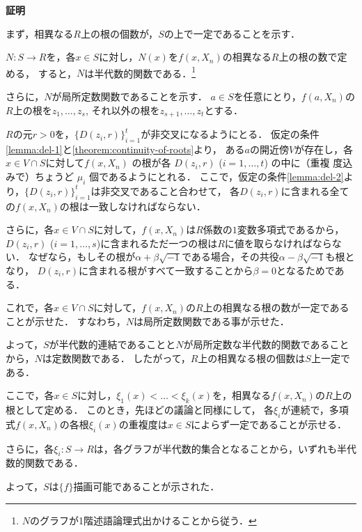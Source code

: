 \documentclass[uplatex, dvipdfmx]{jsarticle}
\makeatletter
\numberwithin{equation}{section}
\renewenvironment{proof}[1][\proofname]{\par
  \pushQED{\qed}%
  \normalfont \topsep6\p@\@plus6\p@\relax
  \trivlist
  \item\relax
  {\bfseries
  #1\@addpunct{.}}\hspace\labelsep\ignorespaces
}{
  \popQED\endtrivlist\@endpefalse
}
\newcommand{\map}[3]{{#1}\colon{#2}\rightarrow{#3}}
\theoremstyle{definition}
\renewcommand{\proofname}{\textbf{証明}}
\makeatother
\begin{document}
\begin{proof}
     まず，相異なる$R$上の根の個数が，$S$の上で一定であることを示す．

     $\map{N}{S}{R}$を，各$x \in S$に対し，$N(x)$を$f(x,X_n)$の相異なる$R$上の根の数で定める，
     すると，$N$は半代数的関数である．\footnote{$N$のグラフが1階述語論理式出かけることから従う．}
     
     さらに，$N$が局所定数関数であることを示す．
     $a \in S$を任意にとり，$f(a,X_n)$の$R$上の根を$z_1, \dots, z_s$, それ以外の根を$z_{s+1}, \dots, z_t$とする．

     $R$の元$r > 0$を，$\{D(z_i,r)\}_{i=1}^t$が非交叉になるようにとる．
     仮定の条件\ref{lemma:del-1}と\cref{theorem:continuity-of-roots}より，
     ある$a$の開近傍$V$が存在し，各$x \in V \cap S$に対して$f (x, X_n)$ の根が各 $D(z_i, r)$ ($i = 1, \dots , t$) の中に（重複
     度込みで）ちょうど $\mu_i$ 個であるようにとれる．
     ここで，仮定の条件\ref{lemma:del-2}より，$\{D(z_i, r)\}_{i=1}^t$は非交叉であること合わせて，
     各$D(z_i, r)$に含まれる全ての$f(x, X_n)$の根は一致しなければならない．

     さらに，各$x \in V \cap S$に対して，$f(x,X_n)$は$R$係数の$1$変数多項式であるから，
     $D(z_i, r)$ ($i=1, \dots, s$)に含まれるただ一つの根は$R$に値を取らなければならない．
     なぜなら，もしその根が$\alpha + \beta \sqrt{-1}$である場合，その共役$\alpha - \beta \sqrt{-1}$も根となり，
     $D(z_i, r)$に含まれる根がすべて一致することから$\beta = 0$となるためである．

     これで，各$x \in V \cap S$に対して，$f(x, X_n)$の$R$上の相異なる根の数が一定であることが示せた．
     すなわち，$N$は局所定数関数である事が示せた．

     よって，$S$が半代数的連結であることと$N$が局所定数な半代数的関数であることから，$N$は定数関数である．
     したがって，$R$上の相異なる根の個数は$S$上一定である．

     ここで，各$x \in S$に対し，$\xi_1(x) < \dots < \xi_k(x)$を，相異なる$f(x, X_n)$の$R$上の根として定める．
     このとき，先ほどの議論と同様にして，
     各$\xi_i$が連続で，多項式$f(x,X_n)$の各根$\xi_i(x)$の重複度は$x \in S$によらず一定であることが示せる．

     さらに，各$\map{\xi_i}{S}{R}$は，各グラフが半代数的集合となることから，いずれも半代数的関数である．

     よって，$S$は$\{f\}$描画可能であることが示された．
\end{proof}
\end{document}
